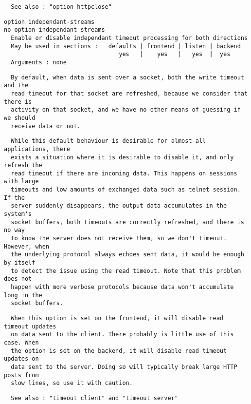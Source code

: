 \begin{verbatim}
  See also : "option httpclose"
\end{verbatim}

\begin{verbatim}
option independant-streams
no option independant-streams
  Enable or disable independant timeout processing for both directions
  May be used in sections :   defaults | frontend | listen | backend
                                 yes   |    yes   |   yes  |  yes
  Arguments : none
\end{verbatim}

\begin{verbatim}
  By default, when data is sent over a socket, both the write timeout and the
  read timeout for that socket are refreshed, because we consider that there is
  activity on that socket, and we have no other means of guessing if we should
  receive data or not.
\end{verbatim}

\begin{verbatim}
  While this default behaviour is desirable for almost all applications, there
  exists a situation where it is desirable to disable it, and only refresh the
  read timeout if there are incoming data. This happens on sessions with large
  timeouts and low amounts of exchanged data such as telnet session. If the
  server suddenly disappears, the output data accumulates in the system's
  socket buffers, both timeouts are correctly refreshed, and there is no way
  to know the server does not receive them, so we don't timeout. However, when
  the underlying protocol always echoes sent data, it would be enough by itself
  to detect the issue using the read timeout. Note that this problem does not
  happen with more verbose protocols because data won't accumulate long in the
  socket buffers.
\end{verbatim}

\begin{verbatim}
  When this option is set on the frontend, it will disable read timeout updates
  on data sent to the client. There probably is little use of this case. When
  the option is set on the backend, it will disable read timeout updates on
  data sent to the server. Doing so will typically break large HTTP posts from
  slow lines, so use it with caution.
\end{verbatim}

\begin{verbatim}
  See also : "timeout client" and "timeout server"
\end{verbatim}

